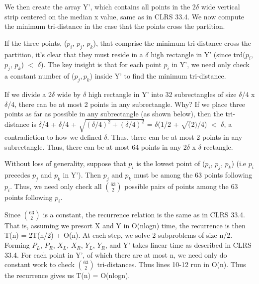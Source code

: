 \documentclass[11pt,a4paper]{article}
\begin{document}
We then create the array Y', which contains all points in the 2$\delta$ wide vertical strip centered on the median x value, same as in CLRS 33.4. We now compute the minimum tri-distance in the case that the points cross the partition. 

If the three points, ($p_{i}$, $p_{j}$, $p_{k}$), that comprise the minimum tri-distance cross the partition, it's clear that they must reside in a $\delta$ high rectangle in Y' (since trd($p_{i}$, $p_{j}$, $p_{k}$) $<$ $\delta$). The key insight is that for each point $p_{i}$ in Y', we need only check a constant number of ($p_{j}, p_{k}$) inside Y' to find the minimum tri-distance. 

If we divide a 2$\delta$ wide by $\delta$ high rectangle in Y' into 32 subrectangles of size $\delta$/4 x $\delta$/4, there can be at most 2 points in any subrectangle. Why? If we place three points as far as possible in any subrectangle (as shown below), then the tri-distance is $\delta$/4 + $\delta$/4 + $\sqrt{(\delta/4)^{2} + (\delta/4)^{2}}$ = $\delta$(1/2 + $\sqrt(2)$/4) $<$ $\delta$, a contradiction to how we defined $\delta$. Thus, there can be at most 2 points in any subrectangle. Thus, there can be at most 64 points in any 2$\delta$ x $\delta$ rectangle. 

Without loss of generality, suppose that $p_{i}$ is the lowest point of ($p_{i}$, $p_{j}$, $p_{k}$) (i.e $p_{i}$ precedes $p_{j}$ and $p_{k}$ in Y'). Then $p_{j}$ and $p_{k}$ must be among the 63 points following $p_{i}$. Thus, we need only check all $\binom{63}{2}$ possible pairs of points among the 63 points following $p_{i}$. 

Since $\binom{63}{2}$ is a constant, the recurrence relation is the same as in CLRS 33.4. That is, assuming we presort X and Y in O(nlogn) time, the recurrence is then T(n) = 2T(n/2) + O(n). At each step, we solve 2 subproblems of size n/2. Forming $P_{L}$, $P_{R}$, $X_{L}$, $X_{R}$, $Y_{L}$, $Y_{R}$, and Y' takes linear time as described in CLRS 33.4. For each point in Y', of which there are at most n, we need only do constant work to check $\binom{63}{2}$ tri-distances. Thus lines 10-12 run in O(n). Thus the recurrence gives us T(n) = O(nlogn). 
\end{document}
